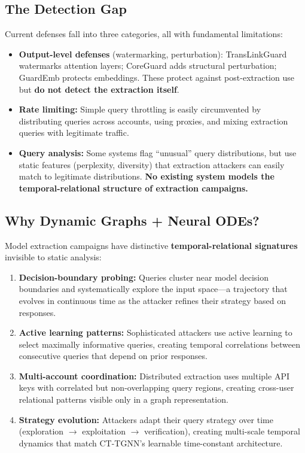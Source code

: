 \documentclass[12pt,a4paper]{article}
\begin{document}
\subsection{The Detection Gap}

Current defenses fall into three categories, all with fundamental limitations:

\begin{itemize}
    \item \textbf{Output-level defenses} (watermarking, perturbation): TransLinkGuard watermarks attention layers; CoreGuard adds structural perturbation; GuardEmb protects embeddings. These protect against post-extraction use but \textbf{do not detect the extraction itself}.
    
    \item \textbf{Rate limiting:} Simple query throttling is easily circumvented by distributing queries across accounts, using proxies, and mixing extraction queries with legitimate traffic.
    
    \item \textbf{Query analysis:} Some systems flag ``unusual'' query distributions, but use static features (perplexity, diversity) that extraction attackers can easily match to legitimate distributions. \textbf{No existing system models the temporal-relational structure of extraction campaigns.}
\end{itemize}

\subsection{Why Dynamic Graphs + Neural ODEs?}

Model extraction campaigns have distinctive \textbf{temporal-relational signatures} invisible to static analysis:

\begin{enumerate}
    \item \textbf{Decision-boundary probing:} Queries cluster near model decision boundaries and systematically explore the input space---a trajectory that evolves in continuous time as the attacker refines their strategy based on responses.
    
    \item \textbf{Active learning patterns:} Sophisticated attackers use active learning to select maximally informative queries, creating temporal correlations between consecutive queries that depend on prior responses.
    
    \item \textbf{Multi-account coordination:} Distributed extraction uses multiple API keys with correlated but non-overlapping query regions, creating cross-user relational patterns visible only in a graph representation.
    
    \item \textbf{Strategy evolution:} Attackers adapt their query strategy over time (exploration $\to$ exploitation $\to$ verification), creating multi-scale temporal dynamics that match CT-TGNN's learnable time-constant architecture.
\end{enumerate}
\end{document}
